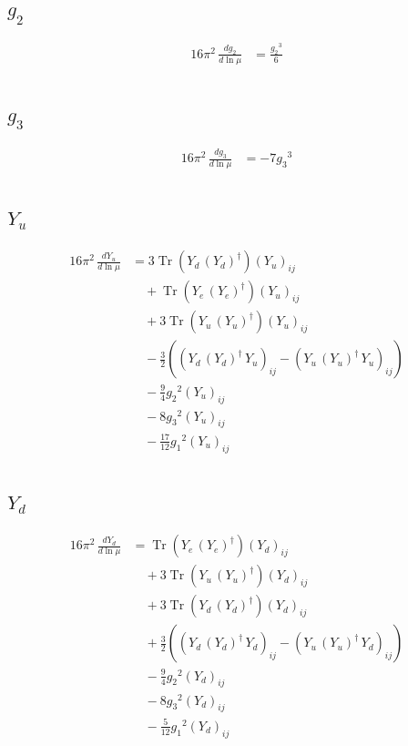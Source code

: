 \documentclass[10pt,a4paper]{article}
\begin{document}
\subsection*{$g_2$}
\begin{align*}
16\pi^2\,\frac{d g_2}{d\ln\mu} &=\frac{{g_2}^3}{6} \\
\end{align*}
\subsection*{$g_3$}
\begin{align*}
16\pi^2\,\frac{d g_3}{d\ln\mu} &=-7 {g_3}^3 \\
\end{align*}
\subsection*{$Y_u$}
\begin{align*}
16\pi^2\,\frac{d Y_u}{d\ln\mu} &=3 \operatorname{Tr}\!\left({Y_d}\,\left({Y_d}\right)^{\dagger}\right) \left({Y_u}\right)_{ij} \\
&\quad +\operatorname{Tr}\!\left({Y_e}\,\left({Y_e}\right)^{\dagger}\right) \left({Y_u}\right)_{ij} \\
&\quad +3 \operatorname{Tr}\!\left({Y_u}\,\left({Y_u}\right)^{\dagger}\right) \left({Y_u}\right)_{ij} \\
&\quad -\frac{3}{2} (\left({Y_d}\,\left({Y_d}\right)^{\dagger}\,{Y_u}\right)_{ij}-\left({Y_u}\,\left({Y_u}\right)^{\dagger}\,{Y_u}\right)_{ij}) \\
&\quad -\frac{9}{4} {g_2}^2 \left({Y_u}\right)_{ij} \\
&\quad -8 {g_3}^2 \left({Y_u}\right)_{ij} \\
&\quad -\frac{17}{12} {g_1}^2 \left({Y_u}\right)_{ij} \\
\end{align*}
\subsection*{$Y_d$}
\begin{align*}
16\pi^2\,\frac{d Y_d}{d\ln\mu} &=\operatorname{Tr}\!\left({Y_e}\,\left({Y_e}\right)^{\dagger}\right) \left({Y_d}\right)_{ij} \\
&\quad +3 \operatorname{Tr}\!\left({Y_u}\,\left({Y_u}\right)^{\dagger}\right) \left({Y_d}\right)_{ij} \\
&\quad +3 \operatorname{Tr}\!\left({Y_d}\,\left({Y_d}\right)^{\dagger}\right) \left({Y_d}\right)_{ij} \\
&\quad +\frac{3}{2} (\left({Y_d}\,\left({Y_d}\right)^{\dagger}\,{Y_d}\right)_{ij}-\left({Y_u}\,\left({Y_u}\right)^{\dagger}\,{Y_d}\right)_{ij}) \\
&\quad -\frac{9}{4} {g_2}^2 \left({Y_d}\right)_{ij} \\
&\quad -8 {g_3}^2 \left({Y_d}\right)_{ij} \\
&\quad -\frac{5}{12} {g_1}^2 \left({Y_d}\right)_{ij} \\
\end{align*}
\end{document}
